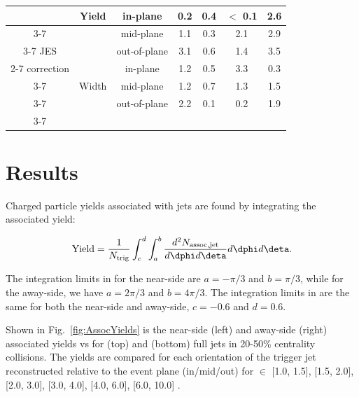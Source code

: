 \begin{table}[!htbp]
\begin{tabular}{c | c | c | c | c | c | c}
		\multirow{6}{*}{} & \multirow{3}{*}{Yield} & in-plane & 0.2 & 0.4 & $<$ 0.1 & 2.6 \\ \cline{3-7}
		& & mid-plane & 1.1 & 0.3 & 2.1 & 2.9 \\ \cline{3-7}
		JES & & out-of-plane & 3.1 & 0.6 & 1.4 & 3.5  \\ \cline{2-7}
		correction & \multirow{3}{*}{Width} & in-plane & 1.2 & 0.5 & 3.3 & 0.3 \\ \cline{3-7}
		& & mid-plane    & 1.2 & 0.7 & 1.3 & 1.5 \\ \cline{3-7}
		& & out-of-plane & 2.2 & 0.1 & 0.2 & 1.9 \\ \cline{3-7} 
		\hline
	\end{tabular}
\end{table}

\section{Results} \label{sect:Results}
\label{sect:Yields}
Charged particle yields associated with jets are found by integrating the associated yield:

\begin{equation}
	\mathrm{Yield} = \frac{1}{N_{\rm trig}} \int_{c}^{d} \int_{a}^{b} 
	\frac{d^2N_{\rm assoc,jet}}{d\dphi d\deta}  d\dphi d\deta.
	\label{Eqtn:YieldResults}
\end{equation}

The integration limits in \dphi for the near-side are $a=-\pi/3$ and $b=\pi/3$, while for the away-side, we have $a=2\pi/3$ and  $b=4\pi/3$.  The integration limits in \deta are the same for both the near-side and away-side, $c=-0.6$ and $d=0.6$.  

Shown in Fig.~\ref{fig:AssocYields} is the near-side (left) and away-side (right) associated yields vs  for  (top) and  \GeVc (bottom) full jets in 20-50\% centrality collisions.  The yields are compared for each orientation of the trigger jet reconstructed relative to the event plane (in/mid/out) for  $\in$ [1.0, 1.5], [1.5, 2.0], [2.0, 3.0], [3.0, 4.0], [4.0, 6.0], [6.0, 10.0] \GeVc.

